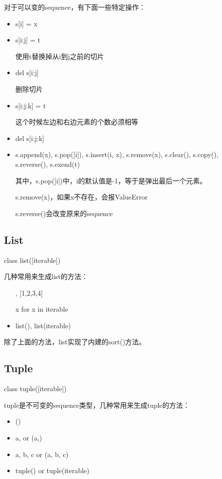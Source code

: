 对于可以变的sequence，有下面一些特定操作：
\begin{itemize}
\item s[i] = x

\item s[i:j] = t

使用t替换掉从i到j之前的切片

\item del s[i:j]

删除切片

\item s[i:j:k] = t

这个时候左边和右边元素的个数必须相等

\item del s[i:j:k]

\item s.append(x), s.pop([i]), s.insert(i, x), s.remove(x), s.clear(), s.copy(), s.reverse(), s.exend(t)

其中，s.pop([i])中，i的默认值是-1，等于是弹出最后一个元素。

s.remove(x)，如果x不存在，会报ValueError

s.reverse()会改变原来的sequence

\end{itemize}


\subsection{List}
class list([iterable])

几种常用来生成list的方法：
\begin{itemize}
\item [], [1,2,3,4]
\item [x for x in iterable]
\item list(), list(iterable)
\end{itemize}

除了上面的方法，list实现了内建的sort()方法。


\subsection{Tuple}
class tuple([iterable])

tuple是不可变的sequence类型，几种常用来生成tuple的方法：
\begin{itemize}
\item ()
\item a, or (a,)
\item a, b, c or (a, b, c)
\item tuple() or tuple(iterable)
\end{itemize}
